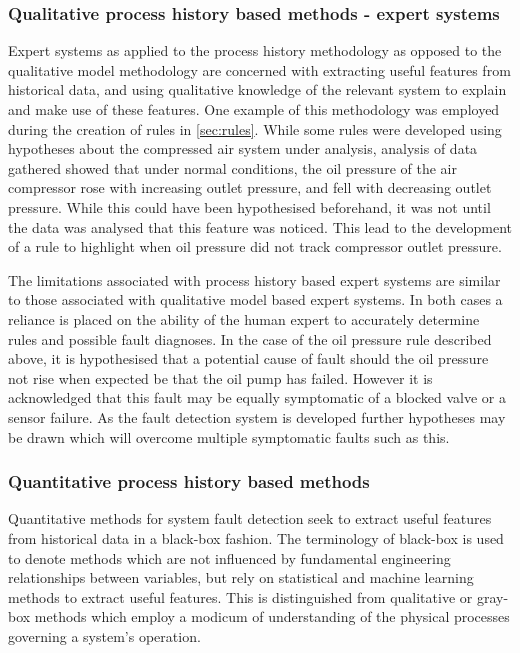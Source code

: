 \subsubsection{Qualitative process history based methods - expert systems}
\label{subsubsec:prochistexpert}
Expert systems as applied to the process history methodology as opposed to the qualitative model methodology are concerned with extracting useful features from historical data, and using qualitative knowledge of the relevant system to explain and make use of these features.
One example of this methodology was employed during the creation of rules in \autoref{sec:rules}. While some rules were developed using hypotheses about the compressed air system under analysis, analysis of data gathered showed that under normal conditions, the oil pressure of the air compressor rose with increasing outlet pressure, and fell with decreasing outlet pressure. While this could have been hypothesised beforehand, it was not until the data was analysed that this feature was noticed. This lead to the development of a rule to highlight when oil pressure did not track compressor outlet pressure.

The limitations associated with process history based expert systems are similar to those associated with qualitative model based expert systems. In both cases a reliance is placed on the ability of the human expert to accurately determine rules and possible fault diagnoses. In the case of the oil pressure rule described above, it is hypothesised that a potential cause of fault should the oil pressure not rise when expected be that the oil pump has failed. However it is acknowledged that this fault may be equally symptomatic of a blocked valve or a sensor failure. As the fault detection system is developed further hypotheses may be drawn which will overcome multiple symptomatic faults such as this.

\subsubsection{Quantitative process history based methods}
Quantitative methods for system fault detection seek to extract useful features from historical data in a black-box fashion. The terminology of black-box is used to denote methods which are not influenced by fundamental engineering relationships between variables, but rely on statistical and machine learning methods to extract useful features. This is distinguished from qualitative or gray-box methods which employ a modicum of understanding of the physical processes governing a system’s operation.

